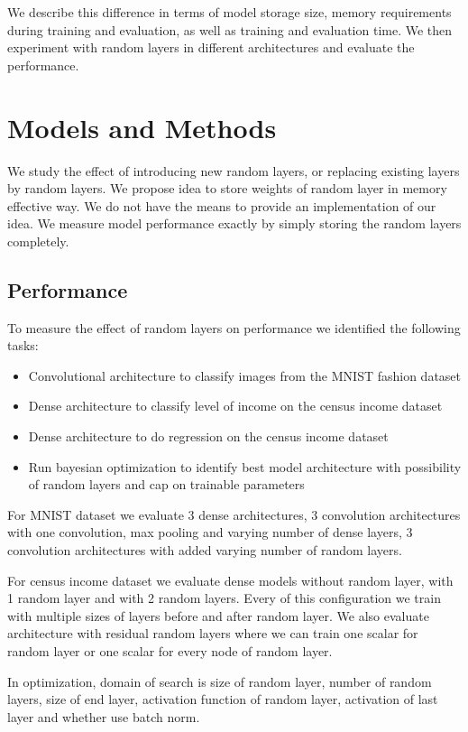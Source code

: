 \documentclass[]{article}
\begin{document}
\begin{multicols}{2}
	We describe this difference in terms of model storage size, memory requirements during training and evaluation, as well as training and evaluation time. We then experiment with random layers in different architectures and evaluate the performance.
	
	\section{Models and Methods}
	We study the effect of introducing new random layers, or replacing existing layers by random layers. We propose idea to store weights of random layer in memory effective way. We do not have the means to provide an implementation of our idea. We measure model performance exactly by simply storing the random layers completely.
	
	\subsection{Performance}
	To measure the effect of random layers on performance we identified the following tasks:
	\begin{itemize}
		\itemsep0em
		\item Convolutional architecture to classify images from the MNIST fashion dataset
		\item Dense architecture to classify level of income on the census income dataset
		\item Dense architecture to do regression on the census income dataset
		\item Run bayesian optimization to identify best model architecture with possibility of random layers and cap on trainable parameters
	\end{itemize}
	For MNIST dataset we evaluate 3 dense architectures, 3 convolution architectures with one convolution, max pooling and varying number of dense layers, 3 convolution architectures with added varying number of random layers.

	For census income dataset we evaluate dense models without random layer, with 1 random layer and with 2 random layers. Every of this configuration we train with multiple sizes of layers before and after random layer. We also evaluate architecture with residual random layers where we can train one scalar for random layer or one scalar for every node of random layer.
	
	In optimization, domain of search is size of random layer, number of random layers, size of end layer, activation function of random layer, activation of last layer and whether use batch norm.	
	

\end{multicols}
\end{document}
